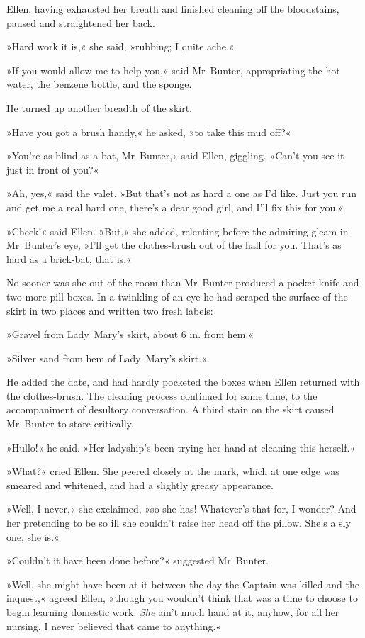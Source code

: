 Ellen, having exhausted her breath and finished cleaning off the bloodstains, paused and straightened her back.

»Hard work it is,« she said, »rubbing; I quite ache.«

»If you would allow me to help you,« said Mr~Bunter, appropriating the hot water, the benzene bottle, and the sponge.

He turned up another breadth of the skirt.

»Have you got a brush handy,« he asked, »to take this mud off?«

»You're as blind as a bat, Mr~Bunter,« said Ellen, giggling. »Can't you see it just in front of you?«

»Ah, yes,« said the valet. »But that's not as hard a one as I'd like.  Just you run and get me a real hard one, there's a dear good girl, and I'll fix this for you.«

»Cheek!« said Ellen. »But,« she added, relenting before the admiring gleam in Mr~Bunter's eye, »I'll get the clothes-brush out of the hall for you. That's as hard as a brick-bat, that is.«

No sooner was she out of the room than Mr~Bunter produced a pocket-knife and two more pill-boxes. In a twinkling of an eye he had scraped the surface of the skirt in two places and written two fresh labels:

»Gravel from Lady~Mary's skirt, about 6 in. from hem.«

»Silver sand from hem of Lady~Mary's skirt.«

He added the date, and had hardly pocketed the boxes when Ellen returned with the clothes-brush. The cleaning process continued for some time, to the accompaniment of desultory conversation. A third stain on the skirt caused Mr~Bunter to stare critically.

»Hullo!« he said. »Her ladyship's been trying her hand at cleaning this herself.«

»What?« cried Ellen. She peered closely at the mark, which at one edge was smeared and whitened, and had a slightly greasy appearance.

»Well, I never,« she exclaimed, »so she has! Whatever's that for, I wonder? And her pretending to be so ill she couldn't raise her head off the pillow. She's a sly one, she is.«

»Couldn't it have been done before?« suggested Mr~Bunter.

»Well, she might have been at it between the day the Captain was killed and the inquest,« agreed Ellen, »though you wouldn't think that was a time to choose to begin learning domestic work. \textit{She} ain't much hand at it, anyhow, for all her nursing. I never believed that came to anything.«

